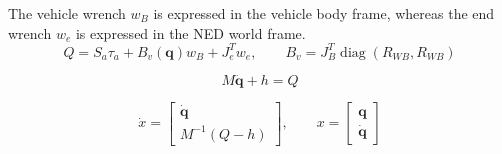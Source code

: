 \documentclass[11pt]{article}
\begin{document}
The vehicle wrench $w_B$ is expressed in the vehicle body frame, whereas the end wrench $w_e$ is expressed in the NED world frame.
\begin{equation}
Q=S_a\tau_a+B_v(\boldsymbol q)w_B+J_e^Tw_e,\qquad B_v=J_B^T\operatorname{diag}(R_{WB},R_{WB})
\end{equation}

\begin{equation}
M\ddot{\boldsymbol q}+h=Q\label{eq:dynamics}
\end{equation}

\begin{equation}
\dot x=\begin{bmatrix}\dot{\boldsymbol q}\\M^{-1}(Q-h)\end{bmatrix},\qquad x=\begin{bmatrix}\boldsymbol q\\\dot{\boldsymbol q}\end{bmatrix}
\end{equation}
\end{document}
